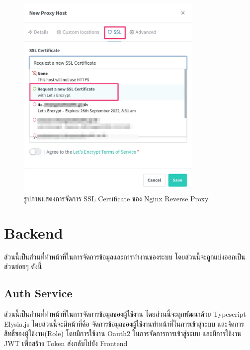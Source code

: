 \begin{figure}
  \centering
  \includegraphics[width=0.8\textwidth]{pictures/encrpt.png}
  \caption{รูปภาพแสดงการจัดการ SSL Certificate ของ Nginx Reverse Proxy}
  \label{fig:reverse_proxy_ssl}
\end{figure}
\section{Backend}
\hspace{1.27cm} \raggedright ส่วนนี้เป็นส่วนที่ทำหน้าที่ในการจัดการข้อมูลและการทำงานของระบบ โดยส่วนนี้จะถูกแบ่งออกเป็นส่วนย่อยๆ ดังนี้
\subsection{Auth Service} 
\hspace{1.27cm} \raggedright ส่วนนี้เป็นส่วนที่ทำหน้าที่ในการจัดการข้อมูลของผู้ใช้งาน โดยส่วนนี้จะถูกพัฒนาด้วย Typescript Elysia.js โดยส่วนนี้จะมีหน้าที่คือ
จัดการข้อมูลของผู้ใช้งานทำหน้าที่ในการเข้าสู่ระบบ และจัดการสิทธิ์ของผู้ใช้งาน(Role) โดยมีการใช้งาน Oauth2 ในการจัดการการเข้าสู่ระบบ และมีการใช้งาน JWT เพื่อสร้าง Token ส่งกลับไปยัง Frontend
